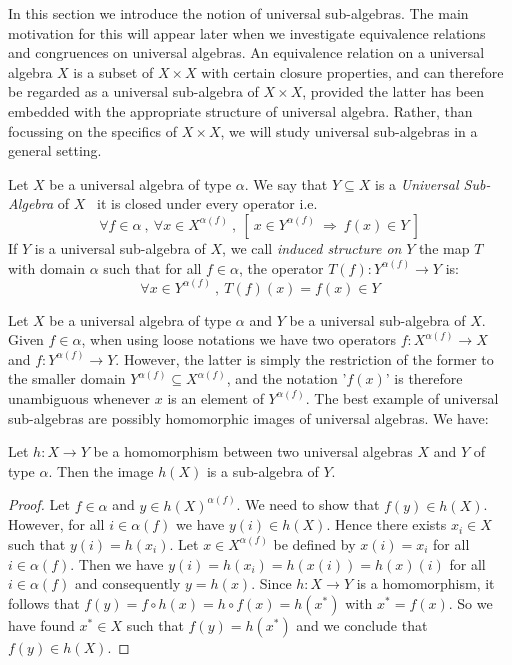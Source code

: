 In this section we introduce the notion of universal sub-algebras.
The main motivation for this will appear later when we investigate
equivalence relations and congruences on universal algebras. An
equivalence relation on a universal algebra $X$ is a subset of
$X\times X$ with certain closure properties, and can therefore be
regarded as a universal sub-algebra of $X\times X$, provided the
latter has been embedded with the appropriate structure of universal
algebra. Rather, than focussing on the specifics of $X\times X$, we
will study universal sub-algebras in a general setting.
\begin{defin}\label{logic:def:universal:sub:algebra}
Let $X$ be a universal algebra of type $\alpha$. We say that
$Y\subseteq X$ is a {\em Universal Sub-Algebra} of $X$ \ifand\ it is
closed under every operator i.e.
    \[
    \forall f\in\alpha\ ,\ \forall x\in X^{\alpha(f)}\ ,\ [\ x\in
    Y^{\alpha(f)}\ \Rightarrow\ f(x)\in Y\ ]
    \]
If $Y$ is a universal sub-algebra of $X$, we call {\em induced
structure on} $Y$ the map $T$ with domain $\alpha$ such that for all
$f\in\alpha$, the operator $T(f):Y^{\alpha(f)}\to Y$ is:
    \[
    \forall x\in Y^{\alpha(f)}\ ,\ T(f)(x) = f(x)\in Y
    \]
\end{defin}

Let $X$ be a universal algebra of type $\alpha$ and $Y$ be a
universal sub-algebra of $X$. Given $f\in\alpha$, when using loose
notations we have two operators $f:X^{\alpha(f)}\to X$ and
$f:Y^{\alpha(f)}\to Y$. However, the latter is simply the
restriction of the former to the smaller domain
$Y^{\alpha(f)}\subseteq X^{\alpha(f)}$, and the notation '$f(x)$' is
therefore unambiguous whenever $x$ is an element of $Y^{\alpha(f)}$.
The best example of universal sub-algebras are possibly homomorphic
images of universal algebras. We have:

\begin{prop}\label{logic:prop:UA:subalg:homomorphic:image}
Let $h:X\to Y$ be a homomorphism between two universal algebras $X$
and $Y$ of type $\alpha$. Then the image $h(X)$ is a sub-algebra of
$Y$.
\end{prop}
\begin{proof}
Let $f\in\alpha$ and $y\in h(X)^{\alpha(f)}$. We need to show that
$f(y)\in h(X)$. However, for all $i\in\alpha(f)$ we have $y(i)\in
h(X)$. Hence there exists $x_{i}\in X$ such that $y(i)=h(x_{i})$.
Let $x\in X^{\alpha(f)}$ be defined by $x(i)=x_{i}$ for all
$i\in\alpha(f)$. Then we have $y(i)=h(x_{i})=h(x(i))=h(x)(i)$ for
all $i\in\alpha(f)$ and consequently $y=h(x)$. Since $h:X\to Y$ is a
homomorphism, it follows that $f(y)=f\circ h(x)=h\circ
f(x)=h(x^{*})$ with $x^{*}=f(x)$. So we have found $x^{*}\in X$ such
that $f(y)=h(x^{*})$ and we conclude that $f(y)\in h(X)$.
\end{proof}

